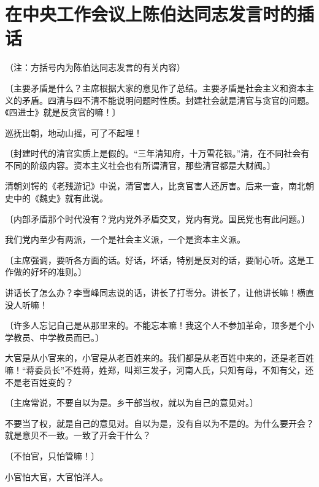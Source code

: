\section[在中央工作会议上陈伯达同志发言时的插话（一九六四年十二月二十七日）]{在中央工作会议上陈伯达同志发言时的插话}

（注：方括号内为陈伯达同志发言的有关内容）

〔主要矛盾是什么？主席根据大家的意见作了总结。主要矛盾是社会主义和资本主义的矛盾。四清与四不清不能说明问题时性质。封建社会就是清官与贪官的问题。《四进士》就是反贪官的嘛！〕

巡抚出朝，地动山摇，可了不起哩！

〔封建时代的清官实质上是假的。“三年清知府，十万雪花银。”清，在不同社会有不同的阶级内容。资本主义社会也有所谓清官，那些清官都是大财阀。〕

清朝刘锷的《老残游记》中说，清官害人，比贪官害人还厉害。后来一查，南北朝史中的《魏史》就有此说。

〔内部矛盾那个时代没有？党内党外矛盾交叉，党内有党。国民党也有此问题。〕

我们党内至少有两派，一个是社会主义派，一个是资本主义派。

〔主席强调，要听各方面的话。好话，坏话，特别是反对的话，要耐心听。这是工作做的好坏的准则。〕

讲话长了怎么办？李雪峰同志说的话，讲长了打零分。讲长了，让他讲长嘛！横直没人听嘛！

〔许多人忘记自己是从那里来的。不能忘本嘛！我这个人不参加革命，顶多是个小学教员、中学教员而已。〕

大官是从小官来的，小官是从老百姓来的。我们都是从老百姓中来的，还是老百姓嘛！“蒋委员长”不姓蒋，姓郑，叫郑三发子，河南人氏，只知有母，不知有父，还不是老百姓变的？

〔主席常说，不要自以为是。乡干部当权，就以为自己的意见对。〕

不要当了权，就是自己的意见对。自以为是，没有自以为不是的。为什么要开会？就是意贝不一致。一致了开会干什么？

〔不怕官，只怕管嘛！〕

小官怕大官，大官怕洋人。


